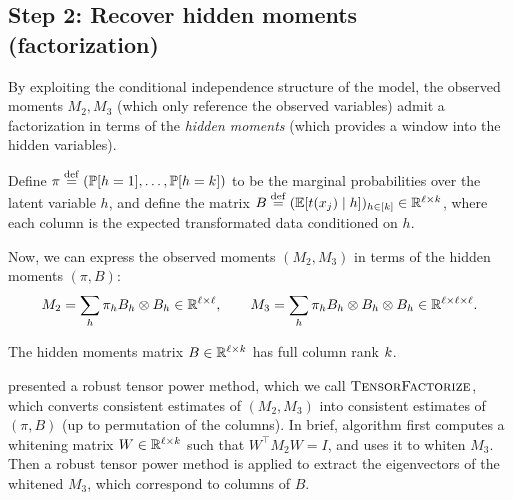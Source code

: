 \subsection{Step 2: Recover hidden moments (factorization)}

By exploiting the conditional independence structure of the model, the observed
moments $M_2,M_3$ (which only reference the observed variables) admit a
factorization in terms of the \emph{hidden moments}
(which provides a window into the hidden variables).

Define
$\pi \stackrel{\rm def}{=} (\mathbb{P}[h=1], \dots, \mathbb{P}[h=k])$ to be the marginal probabilities over the latent variable $h$,
and define the matrix $B \stackrel{\rm def}{=} (\mathbb{E}[t(x_j) \mid h])_{h \in [k]} \in \mathbb{R}^{\ell \times k}$,
where each column is the expected transformated data conditioned on $h$.

Now, we can express the observed moments $(M_2,M_3)$ in terms of the hidden moments $(\pi,B)$:
\begin{align}
  M_2 = \sum_h \pi_h B_h \otimes B_h \in \mathbb{R}^{\ell \times \ell}, \quad\quad
  M_3 = \sum_h \pi_h B_h \otimes B_h \otimes B_h \in \mathbb{R}^{\ell \times \ell \times \ell}.
\end{align}
\begin{assumption}
  The hidden moments matrix $B \in \mathbb{R}^{\ell \times k}$ has full column rank $k$.
\end{assumption}

\citep{anandkumar13tensor} presented a robust tensor power method, which we call $\text{\sc TensorFactorize}$,
which converts consistent estimates of $(M_2,M_3)$ into consistent estimates of $(\pi, B)$ (up to permutation of the columns).
In brief, algorithm first computes a whitening matrix $W \in \mathbb{R}^{\ell \times k}$ such that $W^\top M_2 W = I$,
and uses it to whiten $M_3$.  Then a robust tensor power method is applied to extract the eigenvectors of the whitened $M_3$,
which correspond to columns of $B$.

